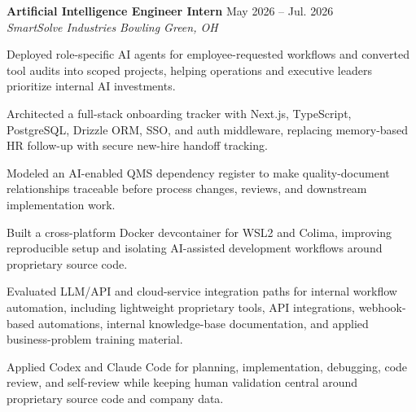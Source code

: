 \documentclass[letterpaper,10pt]{article}
\newcommand{\resumeSubheading}[4]{
  \vspace{2pt}
  \textbf{#1} \hfill #2\\
  \textit{#3} \hfill \textit{#4}
}
\begin{document}
\resumeSubheading
{Artificial Intelligence Engineer Intern}{May 2026 -- Jul. 2026}
{SmartSolve Industries}{Bowling Green, OH}
\begin{tightitemize}
  \item Deployed role-specific AI agents for employee-requested workflows and converted tool audits into scoped projects, helping operations and executive leaders prioritize internal AI investments.
  \item Architected a full-stack onboarding tracker with Next.js, TypeScript, PostgreSQL, Drizzle ORM, SSO, and auth middleware, replacing memory-based HR follow-up with secure new-hire handoff tracking.
  \item Modeled an AI-enabled QMS dependency register to make quality-document relationships traceable before process changes, reviews, and downstream implementation work.
  \item Built a cross-platform Docker devcontainer for WSL2 and Colima, improving reproducible setup and isolating AI-assisted development workflows around proprietary source code.
  \item Evaluated LLM/API and cloud-service integration paths for internal workflow automation, including lightweight proprietary tools, API integrations, webhook-based automations, internal knowledge-base documentation, and applied business-problem training material.
  \item Applied Codex and Claude Code for planning, implementation, debugging, code review, and self-review while keeping human validation central around proprietary source code and company data.
\end{tightitemize}
\end{document}
